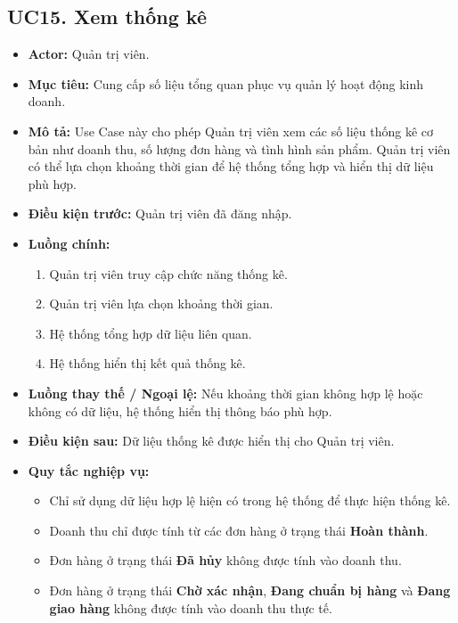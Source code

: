 \documentclass[12pt,a4paper]{article}
\begin{document}

\subsection{UC15. Xem thống kê}

\begin{itemize}

 \item \textbf{Actor:} Quản trị viên.

 \item \textbf{Mục tiêu:} Cung cấp số liệu tổng quan phục vụ quản lý hoạt động kinh doanh.

 \item \textbf{Mô tả:} Use Case này cho phép Quản trị viên xem các số liệu thống kê cơ bản như doanh thu, số lượng đơn hàng và tình hình sản phẩm. Quản trị viên có thể lựa chọn khoảng thời gian để hệ thống tổng hợp và hiển thị dữ liệu phù hợp.

 \item \textbf{Điều kiện trước:} Quản trị viên đã đăng nhập.

 \item \textbf{Luồng chính:}

 \begin{enumerate}

  \item Quản trị viên truy cập chức năng thống kê.

  \item Quản trị viên lựa chọn khoảng thời gian.

  \item Hệ thống tổng hợp dữ liệu liên quan.

  \item Hệ thống hiển thị kết quả thống kê.

 \end{enumerate}

 \item \textbf{Luồng thay thế / Ngoại lệ:} Nếu khoảng thời gian không hợp lệ hoặc không có dữ liệu, hệ thống hiển thị thông báo phù hợp.

 \item \textbf{Điều kiện sau:} Dữ liệu thống kê được hiển thị cho Quản trị viên.

 \item \textbf{Quy tắc nghiệp vụ:}
    \begin{itemize}
        \item Chỉ sử dụng dữ liệu hợp lệ hiện có trong hệ thống để thực hiện thống kê.
        \item Doanh thu chỉ được tính từ các đơn hàng ở trạng thái \textbf{Hoàn thành}.
        \item Đơn hàng ở trạng thái \textbf{Đã hủy} không được tính vào doanh thu.
        \item Đơn hàng ở trạng thái \textbf{Chờ xác nhận}, \textbf{Đang chuẩn bị hàng} và \textbf{Đang giao hàng} không được tính vào doanh thu thực tế.
    \end{itemize}

\end{itemize}
\end{document}
